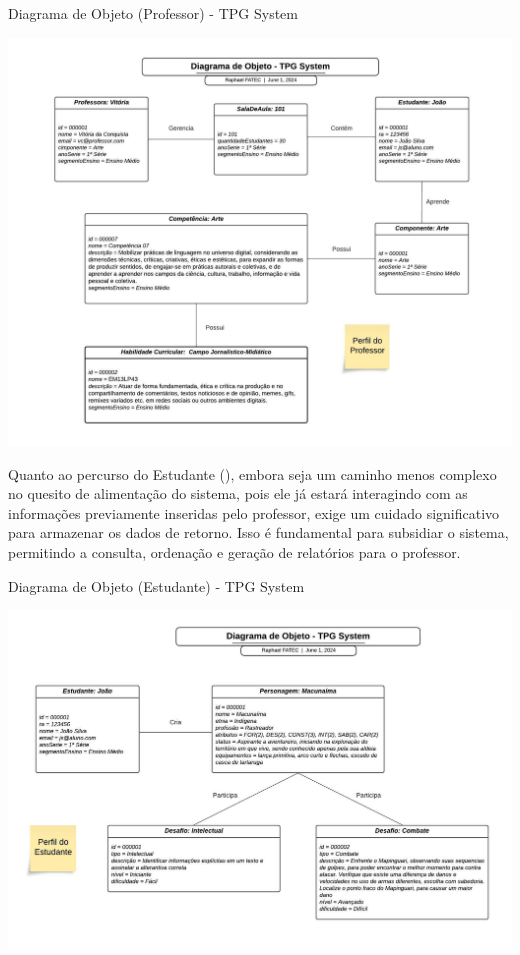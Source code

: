 \begin{flowchart}[!h]
\centering
\caption{Diagrama de Objeto (Professor) - TPG System}%
\label{fcht:imgdgObP.jpg}
\includegraphics[scale=0.50]{Illustrations/imgdgObP.jpeg}
\end{flowchart}

Quanto ao percurso do Estudante (), embora seja um caminho menos complexo no quesito de alimentação do sistema, pois ele já estará interagindo com as informações previamente inseridas pelo professor, exige um cuidado significativo para armazenar os dados de retorno. Isso é fundamental para subsidiar o sistema, permitindo a consulta, ordenação e geração de relatórios para o professor.
\\

\begin{flowchart}[!h]
\centering
\caption{Diagrama de Objeto (Estudante) - TPG System}%
\label{fcht:imgdgObE.jpg}
\includegraphics[scale=0.40]{Illustrations/imgdgObE.jpg}
\end{flowchart}

